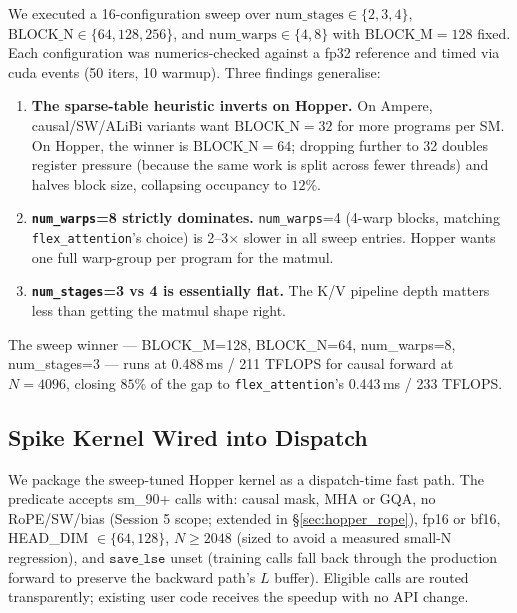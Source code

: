 \documentclass[10pt,twocolumn]{article}
\begin{document}
We executed a 16-configuration sweep over
$\text{num\_stages} \in \{2, 3, 4\}$,
$\text{BLOCK\_N} \in \{64, 128, 256\}$, and
$\text{num\_warps} \in \{4, 8\}$ with $\text{BLOCK\_M}{=}128$ fixed.
Each configuration was numerics-checked against a fp32 reference and
timed via cuda events (50 iters, 10 warmup). Three findings
generalise:

\begin{enumerate}[leftmargin=1.2em,itemsep=2pt]
  \item \textbf{The sparse-table heuristic inverts on Hopper.} On
        Ampere, causal/SW/ALiBi variants want $\text{BLOCK\_N}{=}32$
        for more programs per SM. On Hopper, the winner is
        $\text{BLOCK\_N}{=}64$; dropping further to 32 doubles
        register pressure (because the same work is split across
        fewer threads) and halves block size, collapsing occupancy
        to $12\%$.
  \item \textbf{\texttt{num\_warps}=8 strictly dominates.}
        \texttt{num\_warps}=4 (4-warp blocks, matching
        \texttt{flex\_attention}'s choice) is 2--3$\times$ slower in
        all sweep entries. Hopper wants one full warp-group per
        program for the matmul.
  \item \textbf{\texttt{num\_stages}=3 vs 4 is essentially flat.}
        The K/V pipeline depth matters less than getting the matmul
        shape right.
\end{enumerate}

The sweep winner --- BLOCK\_M=128, BLOCK\_N=64, num\_warps=8,
num\_stages=3 --- runs at 0.488\,ms / 211 TFLOPS for causal forward
at $N{=}4096$, closing $85\%$ of the gap to
\texttt{flex\_attention}'s 0.443\,ms / 233 TFLOPS.

\subsection{Spike Kernel Wired into Dispatch}
\label{sec:hopper_spike}

We package the sweep-tuned Hopper kernel as a dispatch-time fast
path. The predicate accepts sm\_90+ calls with: causal mask, MHA or
GQA, no RoPE/SW/bias (Session 5 scope; extended in
\S\ref{sec:hopper_rope}), fp16 or bf16, HEAD\_DIM $\in \{64,128\}$,
$N \geq 2048$ (sized to avoid a measured small-N regression), and
$\texttt{save\_lse}$ unset (training calls fall back through the
production forward to preserve the backward path's $L$ buffer).
Eligible calls are routed transparently; existing user code receives
the speedup with no API change.
\end{document}
